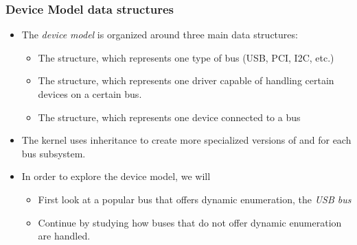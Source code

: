 \begin{frame}
  \frametitle{Device Model data structures}
  \begin{itemize}
  \item The {\em device model} is organized around three main data
    structures:
    \begin{itemize}
    \item The  structure, which represents one type of bus
      (USB, PCI, I2C, etc.)
    \item The  structure, which represents one driver
      capable of handling certain devices on a certain bus.
    \item The  structure, which represents one device
      connected to a bus
    \end{itemize}
  \item The kernel uses inheritance to create more specialized
    versions of  and 
    for each bus subsystem.
  \item In order to explore the device model, we will
    \begin{itemize}
    \item First look at a popular bus that offers dynamic enumeration,
      the {\em USB bus}
    \item Continue by studying how buses that do not offer dynamic
      enumeration are handled.
    \end{itemize}
  \end{itemize}
\end{frame}

